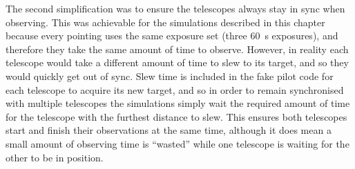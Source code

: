 \begin{colsection}
The second simplification was to ensure the telescopes always stay in sync when observing. This was achievable for the simulations described in this chapter because every pointing uses the same exposure set (three \SI{60}{\second} exposures), and therefore they take the same amount of time to observe. However, in reality each telescope would take a different amount of time to slew to its target, and so they would quickly get out of sync. Slew time is included in the fake pilot code for each telescope to acquire its new target, and so in order to remain synchronised with multiple telescopes the simulations simply wait the required amount of time for the telescope with the furthest distance to slew. This ensures both telescopes start and finish their observations at the same time, although it does mean a small amount of observing time is ``wasted'' while one telescope is waiting for the other to be in position.

\newpage

\end{colsection}

